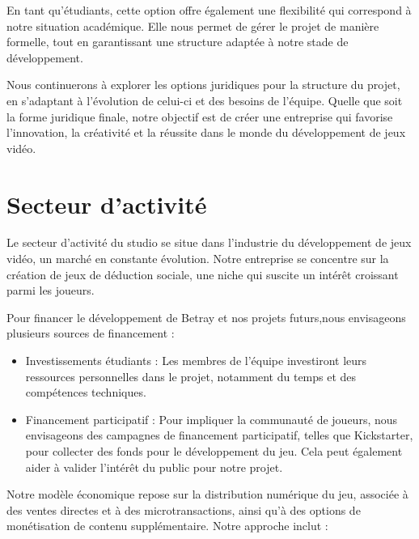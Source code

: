 \documentclass[
	article,			%
	11pt,				%
	oneside,			%
	a4paper,			%
	chapter=TITLE,
	french,			%
	sumario=tradicional
	]{base_nt}
\begin{document}
En tant qu'étudiants, cette option offre également une flexibilité qui correspond à notre situation académique. Elle nous permet de gérer le projet de manière formelle, tout en garantissant une structure adaptée à notre stade de développement.

Nous continuerons à explorer les options juridiques pour la structure du projet, en s'adaptant à l'évolution de celui-ci et des besoins de l'équipe. Quelle que soit la forme juridique finale, notre objectif est de créer une entreprise qui favorise l'innovation, la créativité et la réussite dans le monde du développement de jeux vidéo.

\section{Secteur d'activité}

Le secteur d'activité du studio se situe dans l'industrie du développement de jeux vidéo, un marché en constante évolution. Notre entreprise se concentre sur la création de jeux de déduction sociale, une niche qui suscite un intérêt croissant parmi les joueurs.

Pour financer le développement de Betray et nos projets futurs,nous envisageons plusieurs sources de financement :

\begin{itemize}
    \item Investissements étudiants : Les membres de l'équipe investiront leurs ressources personnelles dans le projet, notamment du temps et des compétences techniques.
    \item Financement participatif : Pour impliquer la communauté de joueurs, nous envisageons des campagnes de financement participatif, telles que Kickstarter, pour collecter des fonds pour le développement du jeu. Cela peut également aider à valider l'intérêt du public pour notre projet.
\end{itemize}

Notre modèle économique repose sur la distribution numérique du jeu, associée à des ventes directes et à des microtransactions, ainsi qu'à des options de monétisation de contenu supplémentaire. Notre approche inclut :
\end{document}
